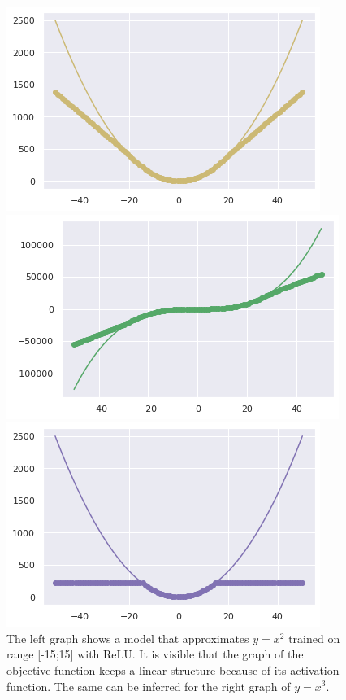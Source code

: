 \documentclass{article}
\begin{document}
\begin{figure}[H]
\begin{multicols}{2}
    \includegraphics[width=\linewidth]{ReLUx2.png}\par 
    \includegraphics[width=\linewidth]{ReLUx3.png}\par 
\end{multicols}
\caption{The left graph shows a model that approximates $y = x^2$ trained on range [-15;15] with ReLU. It is visible that the graph of the objective function keeps a linear structure because of its activation function. The same can be inferred for the right graph of $y=x^3$. }
\begin{multicols}{2}
    \includegraphics[width=\linewidth]{Tanhx2.png}\par

\end{multicols}
\end{figure}
\end{document}
